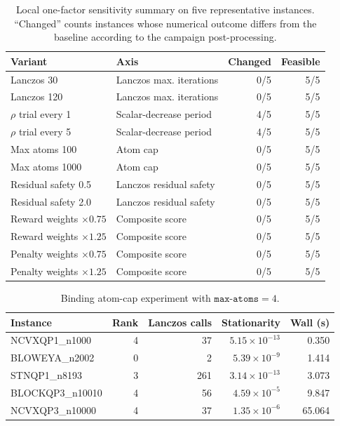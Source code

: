 
\begin{table}[t]
\centering
\caption{Local one-factor sensitivity summary on five representative instances. ``Changed'' counts instances whose numerical outcome differs from the baseline according to the campaign post-processing.}
\label{tab:sensitivity-summary}
\begin{tabular}{llrr}
\toprule
Variant & Axis & Changed & Feasible\\
\midrule
Lanczos 30 & Lanczos max. iterations & 0/5 & 5/5\\
Lanczos 120 & Lanczos max. iterations & 0/5 & 5/5\\
$\rho$ trial every 1 & Scalar-decrease period & 4/5 & 5/5\\
$\rho$ trial every 5 & Scalar-decrease period & 4/5 & 5/5\\
Max atoms 100 & Atom cap & 0/5 & 5/5\\
Max atoms 1000 & Atom cap & 0/5 & 5/5\\
Residual safety 0.5 & Lanczos residual safety & 0/5 & 5/5\\
Residual safety 2.0 & Lanczos residual safety & 0/5 & 5/5\\
Reward weights $\times0.75$ & Composite score & 0/5 & 5/5\\
Reward weights $\times1.25$ & Composite score & 0/5 & 5/5\\
Penalty weights $\times0.75$ & Composite score & 0/5 & 5/5\\
Penalty weights $\times1.25$ & Composite score & 0/5 & 5/5\\
\bottomrule
\end{tabular}
\end{table}

\begin{table}[t]
\centering
\caption{Binding atom-cap experiment with $\texttt{max-atoms}=4$.}
\label{tab:rankcap4}
\begin{tabular}{lrrrr}
\toprule
Instance & Rank & Lanczos calls & Stationarity & Wall (s)\\
\midrule
NCVXQP1\_n1000   & 4 & 37  & $5.15\times10^{-13}$ & 0.350\\
BLOWEYA\_n2002   & 0 & 2   & $5.39\times10^{-9}$  & 1.414\\
STNQP1\_n8193    & 3 & 261 & $3.14\times10^{-13}$ & 3.073\\
BLOCKQP3\_n10010 & 4 & 56  & $4.59\times10^{-5}$  & 9.847\\
NCVXQP3\_n10000  & 4 & 37  & $1.35\times10^{-6}$  & 65.064\\
\bottomrule
\end{tabular}
\end{table}

